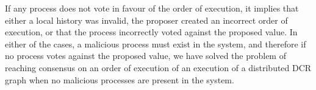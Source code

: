 	\newpar If any process does not vote in favour of the order of execution, it implies that either a local history was invalid, the proposer created an incorrect order of execution, or that the process incorrectly voted against the proposed value. In either of the cases, a malicious process must exist in the system, and therefore if no process votes against the proposed value, we have solved the problem of reaching consensus on an order of execution of an execution of a distributed DCR graph when no malicious processes are present in the system.